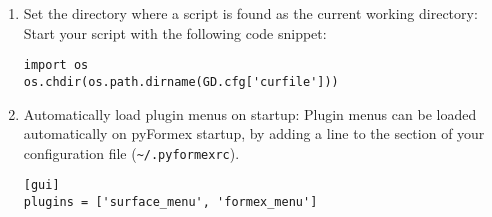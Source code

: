 \begin{enumerate}
\item Set the directory where a script is found as the current working directory:
Start your script with the following code snippet:
\begin{verbatim}
import os
os.chdir(os.path.dirname(GD.cfg['curfile']))
\end{verbatim}

\item Automatically load plugin menus on startup:
Plugin menus can be loaded automatically on pyFormex startup, by adding a line to the  section of your configuration file (\verb|~/.pyformexrc|).
\begin{verbatim}
[gui]
plugins = ['surface_menu', 'formex_menu']
\end{verbatim}

\end{enumerate}


